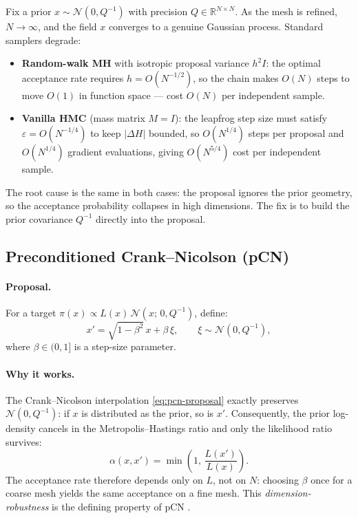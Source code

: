 \documentclass[11pt]{article}
\begin{document}
Fix a prior $x \sim \mathcal{N}(0, Q^{-1})$ with precision $Q \in \mathbb{R}^{N\times N}$.
As the mesh is refined, $N\to\infty$, and the field $x$ converges to a genuine
Gaussian process.  Standard samplers degrade:

\begin{itemize}
  \item \textbf{Random-walk MH} with isotropic proposal variance $h^2 I$:
        the optimal acceptance rate requires $h = O(N^{-1/2})$, so the chain
        makes $O(N)$ steps to move $O(1)$ in function space — cost $O(N)$ per
        independent sample.
  \item \textbf{Vanilla HMC} (mass matrix $M = I$): the leapfrog step size must
        satisfy $\varepsilon = O(N^{-1/4})$ to keep $|\Delta H|$ bounded, so
        $O(N^{1/4})$ steps per proposal and $O(N^{1/4})$ gradient evaluations,
        giving $O(N^{5/4})$ cost per independent sample.
\end{itemize}

The root cause is the same in both cases: the proposal ignores the prior geometry,
so the acceptance probability collapses in high dimensions.  The fix is to build
the prior covariance $Q^{-1}$ directly into the proposal.

\subsection{Preconditioned Crank--Nicolson (pCN)}
\label{sec:pcn}

\paragraph{Proposal.}
For a target $\pi(x) \propto L(x)\,\mathcal{N}(x;\,0,Q^{-1})$, define:
\begin{equation}
  x' = \sqrt{1-\beta^2}\,x + \beta\,\xi, \qquad \xi \sim \mathcal{N}(0, Q^{-1}),
  \label{eq:pcn-proposal}
\end{equation}
where $\beta \in (0,1]$ is a step-size parameter.

\paragraph{Why it works.}
The Crank--Nicolson interpolation \eqref{eq:pcn-proposal} exactly preserves
$\mathcal{N}(0, Q^{-1})$: if $x$ is distributed as the prior, so is $x'$.
Consequently, the prior log-density cancels in the Metropolis--Hastings ratio and
only the likelihood ratio survives:
\begin{equation}
  \alpha(x, x') = \min\!\left(1,\, \frac{L(x')}{L(x)}\right).
  \label{eq:pcn-alpha}
\end{equation}
The acceptance rate therefore depends only on $L$, not on $N$: choosing $\beta$
once for a coarse mesh yields the same acceptance on a fine mesh.  This
\emph{dimension-robustness} is the defining property of pCN
\citep{cotter2013}.
\end{document}
